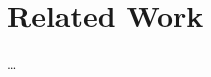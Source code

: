 \chapter{Related Work}\label{ch:related_work}

\ldots{}\cite{rudin2022advancedskillslearninglocomotion}
